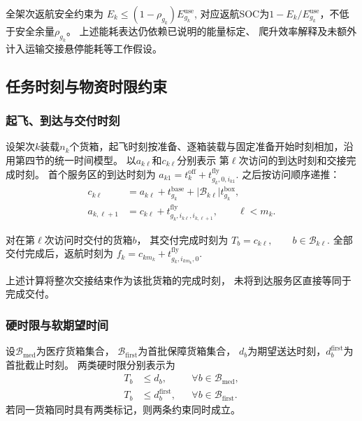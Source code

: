 \documentclass[bwprint]{gmcmthesis}
\begin{document}
全架次返航安全约束为
\(E_k \leq (1-\rho_{g_k})E_{g_k}^{\mathrm{use}}\),
对应返航SOC为$1-E_k/E_{g_k}^{\mathrm{use}}$，不低于安全余量$\rho_{g_k}$。
上述能耗表达仍依赖已说明的能量标定、
爬升效率解释及未额外计入运输交接悬停能耗等工作假设。

\subsection{任务时刻与物资时限约束}

\subsubsection{起飞、到达与交付时刻}

设架次$k$装载$n_k$个货箱，起飞时刻按准备、逐箱装载与固定准备开始时刻相加，沿用第四节的统一时间模型。
以$a_{k\ell}$和$c_{k\ell}$分别表示
第$\ell$次访问的到达时刻和交接完成时刻。
首个服务区的到达时刻为
\(a_{k1} = t_k^{\mathrm{off}} + t_{g_k,0,i_{k1}}^{\mathrm{fly}}\).
之后按访问顺序递推：
\begin{align}
    c_{k\ell}
    &=
    a_{k\ell}
    +t_{g_k}^{\mathrm{base}}
    +|\mathcal{B}_{k\ell}|t_{g_k}^{\mathrm{box}},\\
    a_{k,\ell+1}
    &=
    c_{k\ell}
    +t_{g_k,i_{k\ell},i_{k,\ell+1}}^{\mathrm{fly}},
    \qquad \ell<m_k.
\end{align}

对在第$\ell$次访问时交付的货箱$b$，
其交付完成时刻为
\(T_b=c_{k\ell}, \qquad b\in\mathcal{B}_{k\ell}\).
全部交付完成后，返航时刻为
\(f_k = c_{km_k} + t_{g_k,i_{km_k},0}^{\mathrm{fly}}\).

上述计算将整次交接结束作为该批货箱的完成时刻，
未将到达服务区直接等同于完成交付。

\subsubsection{硬时限与软期望时间}

设$\mathcal{B}_{\mathrm{med}}$为医疗货箱集合，
$\mathcal{B}_{\mathrm{first}}$为首批保障货箱集合，
$d_b$为期望送达时刻，$d_b^{\mathrm{first}}$为首批截止时刻。
两类硬时限分别表示为
\begin{align}
    T_b&\leq d_b,
    &&\forall b\in\mathcal{B}_{\mathrm{med}},\\
    T_b&\leq d_b^{\mathrm{first}},
    &&\forall b\in\mathcal{B}_{\mathrm{first}}.
\end{align}
若同一货箱同时具有两类标记，则两条约束同时成立。
\end{document}
